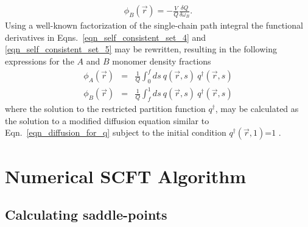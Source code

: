 \documentclass[onecolumn,amsmath,amssymb,floatfix]{elsart}
\begin{document}
%
 \begin{eqnarray}
   \label{eqn_self_consistent_set_5}
   \phi_B({\vec r}) = - \frac{V}{Q} \frac{\delta Q}{\delta \omega_B} .
 \end{eqnarray}
%
Using a well-known factorization of the single-chain path integral
\cite{freed72,feynman_hibbs65_book,helfand74} the functional derivatives in
Eqns.~\ref{eqn_self_consistent_set_4} and \ref{eqn_self_consistent_set_5}
may be rewritten, resulting in the following expressions for the $A$ and $B$
monomer density fractions
%
 \begin{eqnarray}
   \label{eqn_density_A}
   \phi_A({\vec r})
   & = &
   \frac{1}{Q} \int_0^f ds \ q({\vec r},s) \ q^\dagger({\vec r},s) \\
   \label{eqn_density_B}
   \phi_B({\vec r})
   & = &
   \frac{1}{Q} \int_f^1 ds \ q({\vec r},s) \ q^\dagger({\vec r},s)
 \end{eqnarray}
%
where the solution to the restricted partition function $q^\dagger$,
may be calculated as the solution to a modified diffusion equation similar
to Eqn.~\ref{eqn_diffusion_for_q} subject to the initial condition
$q^\dagger({\vec r},1)$=$1$ \cite{matsen_schick94}.


\section{Numerical SCFT Algorithm}
\label{sec_scft_algorithm}


\subsection{Calculating saddle-points}
\label{subsec_saddle_points}
\end{document}
